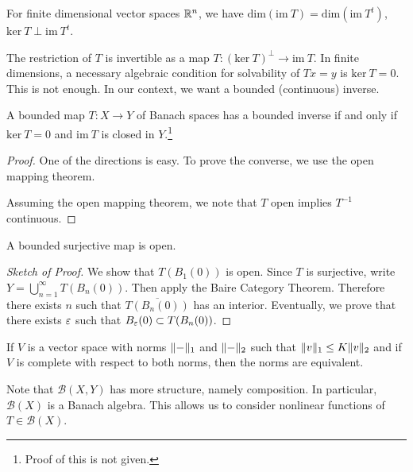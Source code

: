 \documentclass[10pt, twoside]{article}
\begin{document}
    \begin{thm}
        For finite dimensional vector spaces $\mathbb{R}^n$, we have $\mathrm{dim}(\mathrm{im}\ T) = \mathrm{dim}(\mathrm{im}\ T^t)$, $\mathrm{ker}\ T \perp \mathrm{im}\ T^t$.
    \end{thm}

    The restriction of $T$ is invertible as a map $T: (\mathrm{ker}\ T)^{\perp} \to \mathrm{im}\ T$. In finite dimensions, a necessary algebraic condition for solvability of $Tx = y$ is $\mathrm{ker}\ T = 0$. This is not enough. In our context, we want a bounded (continuous) inverse.

    \begin{thm}
        A bounded map $T: X \to Y$ of Banach spaces has a bounded inverse if and only if $\mathrm{ker}\ T = 0$ and $\mathrm{im}\ T$ is closed in $Y$.\footnote{Proof of this is not given.}
        \begin{proof}
            One of the directions is easy. To prove the converse, we use the open mapping theorem.

            Assuming the open mapping theorem, we note that $T$ open implies $T^{-1}$ continuous.
        \end{proof}
    \end{thm}


    \begin{thm}
        A bounded surjective map is open.
        \begin{proof}[Sketch of Proof]
            We show that $T(B_1(0))$ is open. Since $T$ is surjective, write $Y = \bigcup_{n=1}^{\infty} T(B_n(0))$. Then apply the Baire Category Theorem. Therefore there exists $n$ such that $\overline{T(B_n(0))}$ has an interior. Eventually, we prove that there exists $\varepsilon$ such that $B_{\varepsilon}(0) \subset T(B_n(0))$.
        \end{proof}
    \end{thm}
    
    \begin{cor}
        If $V$ is a vector space with norms $\lVert-\rVert_1$ and $\lVert-\rVert_2$ such that $\lVert v\rVert_1 \leq K \lVert v\rVert_2$ and if $V$ is complete with respect to both norms, then the norms are equivalent.
    \end{cor}

    Note that $\mathcal{B}(X,Y)$ has more structure, namely composition. In particular, $\mathcal{B}(X)$ is a Banach algebra. This allows us to consider nonlinear functions of $T \in \mathcal{B}(X)$.
\end{document}
